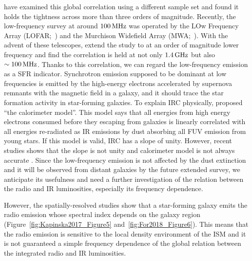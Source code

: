 \citet{Condon1991a,Yun2001a, Bell2003} have examined this global correlation using a different sample set and found it holds the tightness across more than three orders of magnitude.
Recently, the low-frequency survey at around $100\,\mathrm{MHz}$ was operated by the LOw Frequency Array (LOFAR;~\citealt{VanHaarlem2013}) and the Murchison Widefield Array (MWA;~\citealt{Tingay2013a}).
With the advent of these telescopes, \citet{CalistroRivera2017a, Read2018, Wang2019} extend the study to at an order of magnitude lower frequency and find the correlation is held at not only $1.4\,\mathrm{GHz}$ but also $\sim 100\,\mathrm{MHz}$.
Thanks to this correlation, we can regard the low-frequency emission as a SFR indicator.
Synchrotron emission supposed to be dominant at low frequencies is emitted by the high-energy electrons accelerated by supernova remnants with the magnetic field in a galaxy, and it should trace the star formation activity in star-forming galaxies.
To explain IRC physically, \citet{Volk1989} proposed ``the calorimeter model''.
This model says that all energies from high energy electrons consumed before they escaping from galaxies is linearly correlated with all energies re-radiated as IR emissions by dust absorbing all FUV emission from young stars.
If this model is valid, IRC has a slope of unity.
However, recent studies shows that the slope is not unity and calorimeter model is not always accurate \citep{CalistroRivera2017a, Read2018}.
Since the low-frequency emission is not affected by the dust extinction \citep{Yun2001a, Murphy2011} and it will be observed from distant galaxies by the future extended survey, we anticipate its usefulness and need a further investigation of the relation between the radio and IR luminosities, especially its frequency dependence.

However, the spatially-resolved studies show that a star-forming galaxy emits the radio emission whose spectral index depends on the galaxy region \citep{Kapinska2017a, For2018a, Heesen2019} (Figure~\ref{fig:Kapinska2017_Figure5} and~\ref{fig:For2018_Figure6}).
This means that the radio emission is sensitive to the local density environment of the ISM and it is not guaranteed a simple frequency dependence of the global relation between the integrated radio and IR luminosities.

